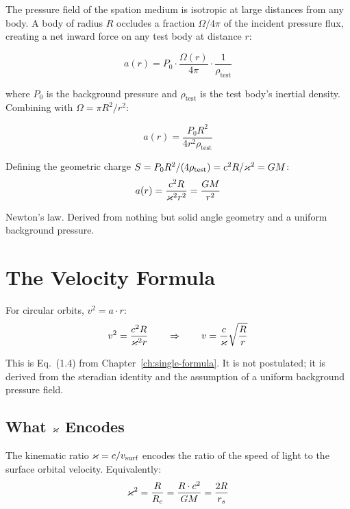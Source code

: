The pressure field of the spation medium is isotropic at large distances from any body. A body of radius $R$ occludes a fraction $\Omega/4\pi$ of the incident pressure flux, creating a net inward force on any test body at distance $r$:

\begin{equation}
  a(r) = P_0 \cdot \frac{\Omega(r)}{4\pi} \cdot \frac{1}{\rho_{\text{test}}}
\end{equation}

where $P_0$ is the background pressure and $\rho_{\text{test}}$ is the test body's inertial density. Combining with $\Omega = \pi R^2/r^2$:

\begin{equation}
  a(r) = \frac{P_0 R^2}{4 r^2 \rho_{\text{test}}}
\end{equation}

Defining the geometric charge $S = P_0 R^2/(4\rho_{\text{test}}) = c^2 R/\varkappa^2 = GM$:
\begin{equation}
  a(r) = \frac{c^2 R}{\varkappa^2 r^2} = \frac{GM}{r^2}
\end{equation}

Newton's law. Derived from nothing but solid angle geometry and a uniform background pressure.


\section{The Velocity Formula}

For circular orbits, $v^2 = a \cdot r$:
\begin{equation}
  v^2 = \frac{c^2 R}{\varkappa^2 r} \qquad\Rightarrow\qquad v = \frac{c}{\varkappa}\sqrt{\frac{R}{r}}
\end{equation}

This is Eq.~(1.4) from Chapter~\ref{ch:single-formula}. It is not postulated; it is derived from the steradian identity and the assumption of a uniform background pressure field.

\subsection{What $\varkappa$ Encodes}

The kinematic ratio $\varkappa = c/v_{\text{surf}}$ encodes the ratio of the speed of light to the surface orbital velocity. Equivalently:
\begin{equation}
  \varkappa^2 = \frac{R}{R_c} = \frac{R \cdot c^2}{GM} = \frac{2R}{r_s}
\end{equation}

